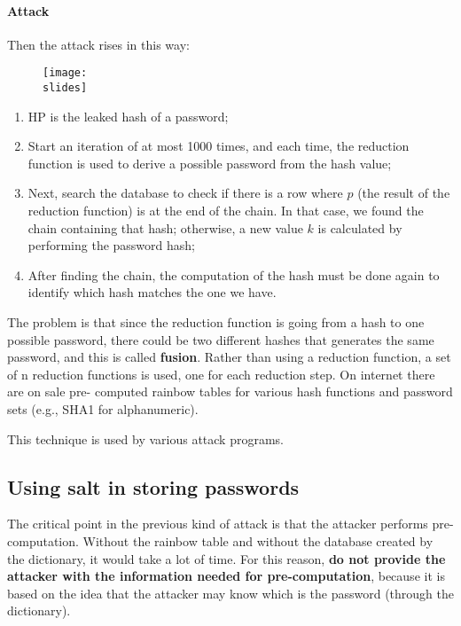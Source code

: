 \paragraph{Attack}
Then the attack rises in this way:
\begin{figure}[h]
  \centering
  \texttt{[image: \\slides]}
\end{figure}

\begin{enumerate}
  \item $\mathrm{HP}$ is the leaked hash of a password;
  \item Start an iteration of at most 1000 times, and each time, the reduction function is used to derive a possible password from the hash value;
  \item Next, search the database to check if there is a row where $p$ (the result of the reduction function) is at the end of the chain. In that case, we found the chain containing that hash; otherwise, a new value $k$ is calculated by performing the password hash;
  \item After finding the chain, the computation of the hash must be done again to identify which hash matches the one we have.
\end{enumerate}

The problem is that since the reduction function is going from a hash to one possible password, there could be
two different hashes that generates the same password, and this is called \textbf{fusion}. Rather than using a reduction
function, a set of n reduction functions is used, one for each reduction step. On internet there are on sale pre-
computed rainbow tables for various hash functions and password sets (e.g., SHA1 for alphanumeric).


This technique is used by various attack programs.


\subsection{Using salt in storing passwords}
The critical point in the previous kind of attack is that the attacker performs pre-computation. Without the rainbow
table and without the database created by the dictionary,
it would take a lot of time. For this reason, \textbf{do not provide the attacker with the information needed for pre-computation},
because it is based on the idea that the attacker may know which is the password (through the dictionary).

